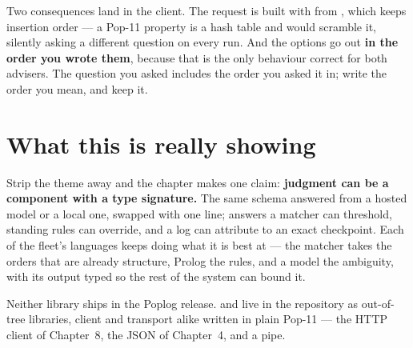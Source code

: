 Two consequences land in the client. The request is built with
 from , which keeps insertion order --- a
Pop-11 property is a hash table and would scramble it, silently asking a
different question on every run. And the options go out \textbf{in the
order you wrote them}, because that is the only behaviour correct for both
advisers. The question you asked includes the order you asked it in; write
the order you mean, and keep it.

\section{What this is really showing}

Strip the theme away and the chapter makes one claim: \textbf{judgment can
be a component with a type signature.} The same schema answered from a
hosted model or a local one, swapped with one  line; answers a
matcher can threshold, standing rules can override, and a log can attribute
to an exact checkpoint. Each of the fleet's languages keeps doing what it
is best at --- the matcher takes the orders that are already structure,
Prolog the rules, and a model the ambiguity, with its output typed so the
rest of the system can bound it.

Neither library ships in the Poplog release.  and
 live in the repository as out-of-tree libraries,
client and transport alike written in plain Pop-11 --- the HTTP client of
Chapter~8, the JSON of Chapter~4, and a pipe.
